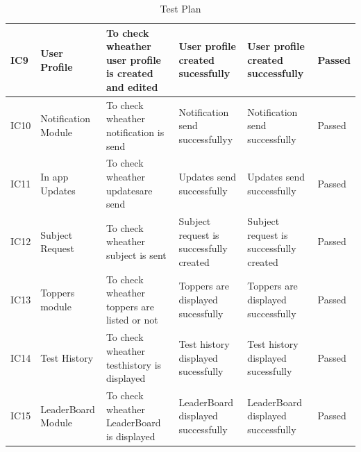 \documentclass[oneside,a4paper,12pt]{report}
\begin{document}
\begin{table}[h]
\cntering
\begin{tabular}{|p{0.7in}|p{0.7in}|p{1.2in}|p{0.8in}|p{0.8in}|p{0.5in}|}
\hline	  
IC9 &	User Profile &	To check \newline wheather user \newline profile is \newline created and edited	& User profile created sucessfully & User profile created successfully & Passed
\\
\hline	  
IC10 &	Notification Module &	To check \newline wheather notification \newline is send & Notification send successfullyy &	Notification send successfully	 & Passed
\\
\hline	  
IC11 &	In app Updates &	To check \newline wheather updates\newline are send & Updates send successfully &	Updates send successfully	 & Passed
\\
\hline	  
IC12 &	Subject  Request &	To check \newline wheather subject \newline is sent & Subject request is successfully created &	Subject request is successfully created	 & Passed
\\
\hline	  
IC13 &	Toppers module &	To check \newline wheather \newline toppers \newline are listed \newline or not & Toppers are displayed sucessfully &	Toppers are displayed successfully	 & Passed
\\
\hline	  
IC14 &	Test History &	To check \newline wheather test\newline history is \newline displayed & Test history displayed sucessfully &	Test history displayed sucessfully	 & Passed
\\

\hline	  
IC15 &	LeaderBoard Module &	To check \newline wheather \newline LeaderBoard \newline is displayed & LeaderBoard displayed successfully &	LeaderBoard displayed successfully	 & Passed
\\
\hline
\end{tabular}
\caption{Test Plan}
\end{table}
\end{document}
